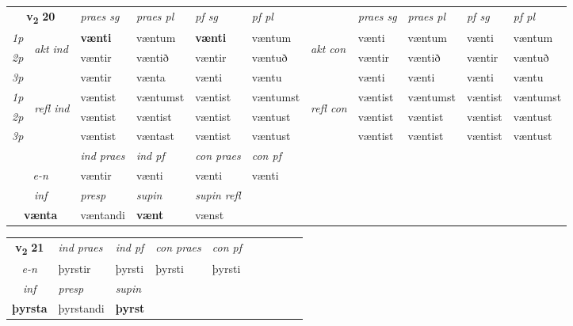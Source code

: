 \noindent
\begin{tabular}{lllllllllll} \toprule
\multicolumn{2}{c}{\textbf{v{\textsubscript{2}}} \Large{\textbf{20}}}  &  \textit{praes sg}  & \textit{praes pl}  &\textit{ pf sg} & \textit{pf pl} &  &  \textit{praes sg}  & \textit{praes pl}  & \textit{pf sg} & \textit{pf pl } \\*
	\cmidrule{3-6} \cmidrule{8-11}
 {\textit{1p}} & \multirow{3}{*}{\begin{turn}{90}\textit{akt ind}\end{turn}} & \textbf{vænti} & væntum & \textbf{vænti} & væntum & \multirow{3}{*}{\begin{turn}{90}\textit{akt con}\end{turn}} &vænti & væntum & vænti & væntum\\*
 {\textit{2p}} &  &  væntir  & væntið & væntir & væntuð & & væntir & væntið & væntir & væntuð \\*
{\textit{3p}} &  & væntir & vænta & vænti & væntu & & vænti & vænti& vænti & væntu \\*
\cmidrule{3-6} \cmidrule{8-11}
 {\textit{1p}} & \multirow{3}{*}{\begin{turn}{90}\textit{refl ind}\end{turn}}  & væntist & væntumst & væntist & væntumst & \multirow{3}{*}{\begin{turn}{90}\textit{refl con}\end{turn}}  &væntist & væntumst & væntist & væntumst \\*
 {\textit{2p}} &  & væntist & væntist & væntist & væntust & &væntist & væntist & væntist & væntust \\*
 {\textit{3p}}  & & væntist & væntast & væntist & væntust & & væntist & væntist& væntist & væntust \\*
\cmidrule{3-6} \cmidrule{8-11}

   & &  \textit{ind praes} & \textit{ind pf} & \textit{con praes} & \textit{con pf} \\*
\multicolumn{2}{c}{ \textit{e-n} } & væntir & vænti & vænti & vænti \\*

\cmidrule{3-5}
   \multicolumn{2}{c}{\textit{inf}}     & \textit{presp} & \textit{supin} & \textit{supin refl}  \\*
  \multicolumn{2}{c}{\textbf{vænta}}      & væntandi &  \textbf{vænt} & vænst  \\*
\end{tabular}

\noindent
\begin{tabular}{lllllllllll} \toprule
\multicolumn{2}{c}{\textbf{v{\textsubscript{2}}} \Large{\textbf{21}}}  &  \textit{ind praes} & \textit{ind pf} & \textit{con praes} & \textit{con pf} \\*
\multicolumn{2}{c}{ \textit{e-n} } & þyrstir & þyrsti & þyrsti & þyrsti \\*

\cmidrule{3-4}
   \multicolumn{2}{c}{\textit{inf}}     & \textit{presp} & \textit{supin}   \\*
  \multicolumn{2}{c}{\textbf{þyrsta}}      & þyrstandi &  \textbf{þyrst}   \\*
\end{tabular}

